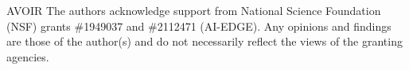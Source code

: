 


AVOIR
The authors acknowledge support from National Science Foundation (NSF) grants \#1949037 and  \#2112471 (AI-EDGE).
Any opinions and findings are those of the author(s) and do not necessarily reflect the views of the granting agencies.